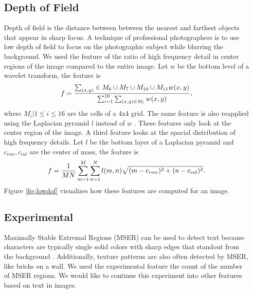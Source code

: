\documentclass[conference,a4paper]{IEEEtran}
\newcommand{\kamelia}[1]{{\color{blue}{#1}}}
\begin{document}
  \subsection{Depth of Field}
  Depth of field is the distance between between the nearest and farthest objects that appear in sharp focus.  A technique of professional photographers is to use low depth of field to focus on the photographic subject while blurring the background.  We used the feature \cite{datta2006studying} of the ratio of high frequency detail in center regions of the image compared to the entire image.  Let $w$ be the bottom level of a wavelet transform, the feature is
  \begin{equation}
    f ={\sum_{(x,y)}\in M_6\cup M_7\cup M_{10}\cup M_{11} w(x,y) \over \sum_{i=1}^{16}\sum_{(x,y)\in M_i} w(x,y)} ,
  \end{equation}
  where $M_i | 1 \le i \le 16$ are the cells of a 4x4 grid.  The same feature is also reapplied using the Laplacian pyramid $l$ instead of $w$ \cite{wang2015automatic}.  These features only look at the center region of the image.  A third feature \cite{wang2015automatic} looks at the spacial distribution of high frequency details.  Let $l$ be the bottom layer of a Laplacian pyramid and $c_{row}, c_{col}$ are the center of mass, the feature is
  \begin{equation} 
    f = {1 \over MN} \sum_{m=1}^M\sum_{n=1}^N l(m,n)\sqrt{(m-c_{row})^2 + (n-c_{col})^2} .
  \end{equation}
  Figure \ref{fig:lowdof} visualizes how these features are computed for an image.

  \subsection{Experimental}
  Maximally Stable Extremal Regions (MSER) \cite{matas2004robust} can be used to detect text because characters are typically single solid colors with sharp edges that standout from the background \cite{chen2011robust}.  Additionally, texture patterns are also often detected by MSER, like bricks on a wall.  We used the experimental feature the count of the number of MSER regions.  We would like to continue this experiment into other features based on text in images.
 
 \kamelia{fix from here on\\}
\end{document}
